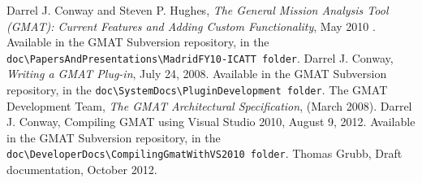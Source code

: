 \documentclass[10pt,letterpaper]{article}
\begin{document}
\begin{thebibliography}{}
Darrel J. Conway and Steven P. Hughes, \textit{The General Mission Analysis Tool (GMAT): Current Features and Adding Custom Functionality}, May 2010 . Available in the GMAT Subversion repository, in the \texttt{doc{\textbackslash}PapersAndPresentations{\textbackslash}MadridFY10-ICATT folder}.
Darrel J. Conway, \textit{Writing a GMAT Plug-in}, July 24, 2008. Available in the GMAT Subversion repository, in the \texttt{doc{\textbackslash}SystemDocs{\textbackslash}PluginDevelopment folder}.
 The GMAT Development Team, \textit{The GMAT Architectural Specification}, (March 2008). 
Darrel J. Conway, Compiling GMAT using Visual Studio 2010, August 9, 2012. Available in the GMAT Subversion repository, in the \texttt{doc{\textbackslash}DeveloperDocs{\textbackslash}CompilingGmatWithVS2010 folder}.
 Thomas Grubb, Draft documentation, October 2012. 

\end{thebibliography}
\end{document}
